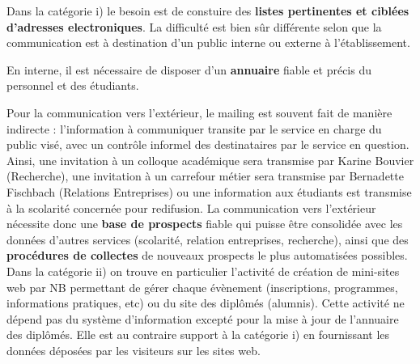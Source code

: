 \documentclass{book}
\begin{document}
Dans la catégorie i) le besoin est de constuire des \textbf{listes 
pertinentes et ciblées d'adresses electroniques}. La difficulté
est bien sûr différente selon que la communication est à destination
d'un public interne ou externe à l'établissement.

En interne, il est nécessaire de disposer d'un \textbf{annuaire}
fiable et précis du personnel et des étudiants.

Pour la communication vers l'extérieur, le mailing est souvent 
fait de manière indirecte : l'information à communiquer transite par
le service en charge du public visé, avec un contrôle informel des 
destinataires par le service en question. Ainsi, une invitation à un 
colloque académique sera transmise par Karine Bouvier (Recherche),
une invitation à un carrefour métier sera transmise par Bernadette 
Fischbach (Relations Entreprises) ou une information aux étudiants
est transmise à la scolarité concernée pour redifusion. La communication 
vers l'extérieur nécessite donc une \textbf{base de prospects} fiable 
qui puisse être consolidée avec les données d'autres services (scolarité, 
relation entreprises, recherche), ainsi que des \textbf{procédures 
de collectes} de nouveaux prospects le plus automatisées possibles.\\

Dans la catégorie ii) on trouve en particulier l'activité de création
de mini-sites web par NB permettant de gérer chaque évènement (inscriptions,
programmes, informations pratiques, etc) ou du site des diplômés (alumnis).
Cette activité ne dépend pas du système d'information excepté pour
la mise à jour de l'annuaire des diplômés. Elle est au contraire 
support à la catégorie i) en fournissant les données déposées par les
visiteurs sur les sites web.\\ 
\end{document}
